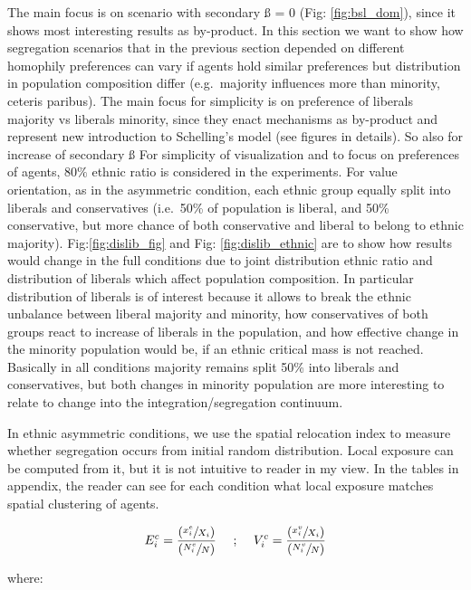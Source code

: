 \documentclass[
]{article}
\begin{document}
The main focus is on scenario with secondary ß = 0 (Fig:
\ref{fig:bsl_dom}), since it shows most interesting results as
by-product. In this section we want to show how segregation scenarios
that in the previous section depended on different homophily preferences
can vary if agents hold similar preferences but distribution in
population composition differ (e.g.~majority influences more than
minority, ceteris paribus). The main focus for simplicity is on
preference of liberals majority vs liberals minority, since they enact
mechanisms as by-product and represent new introduction to Schelling's
model (see figures in details). So also for increase of secondary ß For
simplicity of visualization and to focus on preferences of agents,
\(80\%\) ethnic ratio is considered in the experiments. For value
orientation, as in the asymmetric condition, each ethnic group equally
split into liberals and conservatives (i.e.~50\% of population is
liberal, and 50\% conservative, but more chance of both conservative and
liberal to belong to ethnic majority). Fig:\ref{fig:dislib_fig} and Fig:
\ref{fig:dislib_ethnic} are to show how results would change in the full
conditions due to joint distribution ethnic ratio and distribution of
liberals which affect population composition. In particular distribution
of liberals is of interest because it allows to break the ethnic
unbalance between liberal majority and minority, how conservatives of
both groups react to increase of liberals in the population, and how
effective change in the minority population would be, if an ethnic
critical mass is not reached. Basically in all conditions majority
remains split 50\% into liberals and conservatives, but both changes in
minority population are more interesting to relate to change into the
integration/segregation continuum.

In ethnic asymmetric conditions, we use the spatial relocation index to
measure whether segregation occurs from initial random distribution.
Local exposure can be computed from it, but it is not intuitive to
reader in my view. In the tables in appendix, the reader can see for
each condition what local exposure matches spatial clustering of agents.

\begin{equation}
    E^c_i = \frac{(\sfrac{x^e_i}{X_i})}{(\sfrac{N^e_i}{N})}  \quad\text{        ;          }\quad  V^c_i = \frac{(\sfrac{x^v_i}{X_i})}{(\sfrac{N^v_i}{N})} 
\end{equation}

where:
\end{document}
